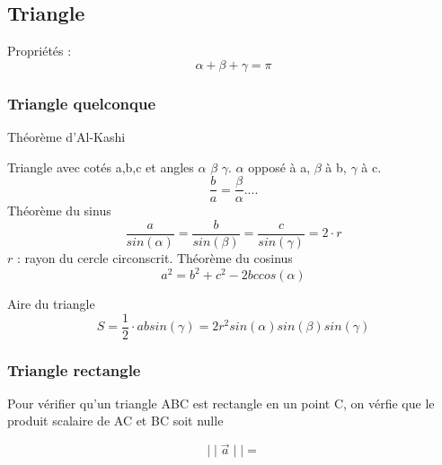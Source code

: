 \subsection{Triangle}
Propriétés : \\
\begin{equation}
\alpha+\beta+\gamma=\pi
\end{equation}


\subsubsection{Triangle quelconque}


Théorème d'Al-Kashi



Triangle avec cotés a,b,c et angles $\alpha$ $\beta$ $\gamma$. $\alpha$ opposé à a, $\beta$ à b, $\gamma$ à c. 
\begin{equation}
\frac{b}{a}=\frac{\beta}{\alpha}....
\end{equation}
Théorème du sinus
\begin{equation}
\frac{a}{sin(\alpha)}=\frac{b}{sin(\beta)}=\frac{c}{sin(\gamma)}=2\cdot r
\end{equation}
$r$ : rayon du cercle circonscrit. 
Théorème du cosinus
\begin{equation}
a^2=b^2+c^2 - 2 b c cos(\alpha)
\end{equation}

Aire du triangle
\begin{equation}
S=\frac{1}{2}\cdot a b sin(\gamma)=2r^2sin(\alpha)sin(\beta)sin(\gamma)
\end{equation}
\subsubsection{Triangle rectangle}

Pour vérifier qu'un triangle ABC est rectangle en un point C, on vérfie que le produit scalaire de AC et BC soit nulle


\begin{equation}
\mid \mid \vec{a}\mid \mid =
\end{equation}
